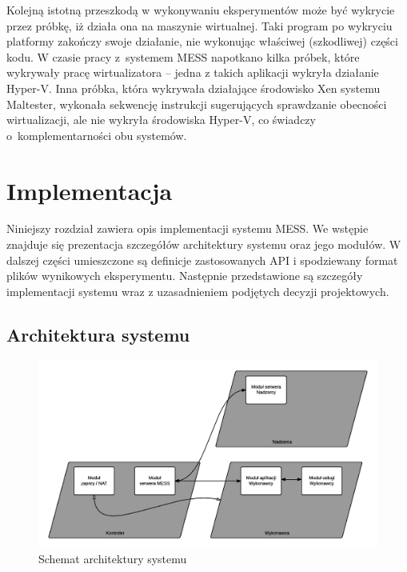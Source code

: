 \documentclass[a4paper,12pt,oneside]{article}
\begin{document}
	Kolejną istotną przeszkodą w wykonywaniu eksperymentów może być wykrycie przez próbkę, iż działa ona na maszynie wirtualnej. Taki program po wykryciu platformy zakończy swoje działanie, nie wykonując właściwej (szkodliwej) części kodu. W czasie pracy z~systemem MESS napotkano kilka próbek, które wykrywały pracę wirtualizatora -- jedna z takich aplikacji wykryła działanie Hyper-V. Inna próbka, która wykrywała działające środowisko Xen systemu Maltester, wykonała sekwencję instrukcji sugerujących sprawdzanie obecności wirtualizacji, ale nie wykryła środowiska Hyper-V, co świadczy o~komplementarności obu systemów.
			
	\newpage	
	
	\section{Implementacja}
	Niniejszy rozdział zawiera opis implementacji systemu MESS. We wstępie znajduje się prezentacja szczegółów architektury systemu oraz jego modułów. W dalszej części umieszczone są definicje zastosowanych API i spodziewany format plików wynikowych eksperymentu. Następnie przedstawione są szczegóły implementacji systemu wraz z uzasadnieniem podjętych decyzji projektowych.	
	
	\subsection{Architektura systemu}		
	
	\begin{figure}[ht]
		\includegraphics[scale=0.7]{gfx/schema-architecture.png}
		\caption{Schemat architektury systemu}
	\end{figure}	
	
\end{document}
